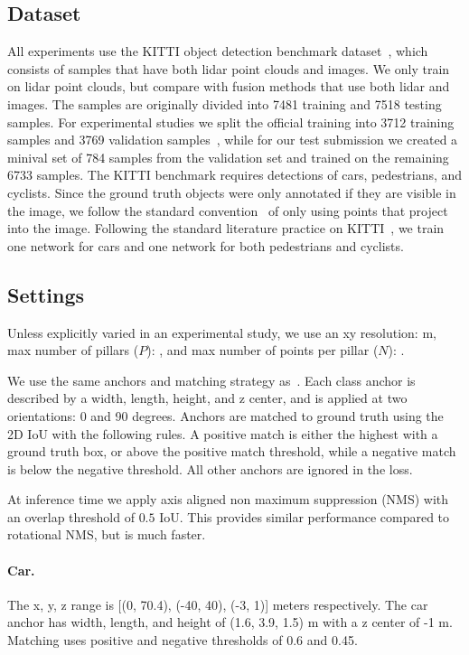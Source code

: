 \documentclass[10pt,twocolumn,letterpaper]{article}
\newcommand{\mypar}[1]{\vspace{-4mm}\paragraph{#1}}
\newcommand{\squeeze}{\vspace{-0.5mm}}
\begin{document}
\subsection{Dataset}
\squeeze
All experiments use the KITTI object detection benchmark dataset~\cite{kitti}, which consists of samples that have both lidar point clouds and images.
We only train on lidar point clouds, but compare with fusion methods that use both lidar and images.
The samples are originally divided into 7481 training and 7518 testing samples.
For experimental studies we split the official training into 3712 training samples and 3769 validation samples~\cite{chen20153d}, while for our test submission we created a minival set of 784 samples from the validation set and trained on the remaining 6733 samples.
The KITTI benchmark requires detections of cars, pedestrians, and cyclists.
Since the ground truth objects were only annotated if they are visible in the image, we follow the standard convention~\cite{mv3d, voxelnet} of only using \lidar points that project into the image.
Following the standard literature practice on KITTI~\cite{avod,voxelnet,second}, we train one network for cars and one network for both pedestrians and cyclists.

\squeeze
\subsection{Settings}
\squeeze

Unless explicitly varied in an experimental study, we use an xy resolution: \xyres m,  max number of pillars ($P$): \maxpillars, and  max number of points per pillar ($N$): \maxpts.

We use the same anchors and matching strategy as~\cite{voxelnet}.
Each class anchor is described by a width, length, height, and z center, and is applied at two orientations: 0 and 90 degrees.
Anchors are matched to ground truth using the 2D IoU with the following rules.
A positive match is either the highest with a ground truth box, or above the positive match threshold, while a negative match is below the negative threshold.
All other anchors are ignored in the loss.

At inference time we apply axis aligned non maximum suppression (NMS) with an overlap threshold of $0.5$ IoU.
This provides similar performance compared to rotational NMS, but is much faster.

\mypar{Car.}
The x, y, z range is [(0, 70.4), (-40, 40), (-3, 1)] meters respectively.
The car anchor has width, length, and height of (1.6, 3.9, 1.5) m with a z center of -1 m.
Matching uses positive and negative thresholds of 0.6 and 0.45.
\end{document}
